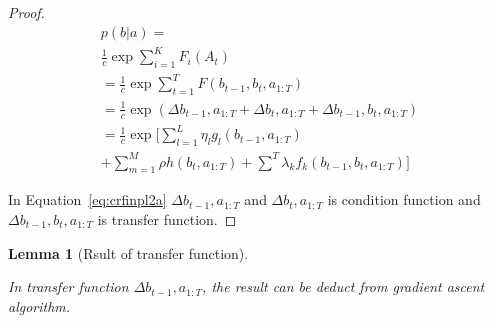\documentclass[journal,transmag]{IEEEtran}
\newtheorem{lemma}{Lemma}
\begin{document}
\begin{proof}
\begin{equation}\label{eq:crfinpl2c}
\begin{array}{ll}
      p(b|a)= \\
      \frac{1}{c} \exp \sum^K_{i=1} F_i (A_{t}) \\ 
      = \frac{1}{c} \exp \sum^T_{t=1} F(b_{t-1},b_t,a_{1:T}) \\
      = \frac{1}{c} \exp (\Delta b_{t-1},a_{1:T} + \Delta b_t,a_{1:T} + \Delta b_{t-1},b_t, a_{1:T}  ) \\
      = \frac{1}{c} \exp \lbrack \sum^L_{l=1} \eta_l g_l (b_{t-1},a_{1:T}) \\
      + \sum^M_{m=1} \rho h(b_t,a_{1:T}) + \sum^T \lambda_k f_k (b_{t-1},b_t,a_{1:T} ) \rbrack
\end{array}
\end{equation}

In Equation~\ref{eq:crfinpl2a} $\Delta b_{t-1},a_{1:T}$ and $\Delta b_t,a_{1:T}$ is condition function and  $\Delta b_{t-1},b_t, a_{1:T}$ is transfer function. 

\end{proof}

\begin{lemma}[Rsult of transfer function]\label{lem:transf}

In transfer function $\Delta b_{t-1},a_{1:T}$,  the result can be deduct from  gradient  ascent  algorithm.
\end{lemma}
\end{document}
